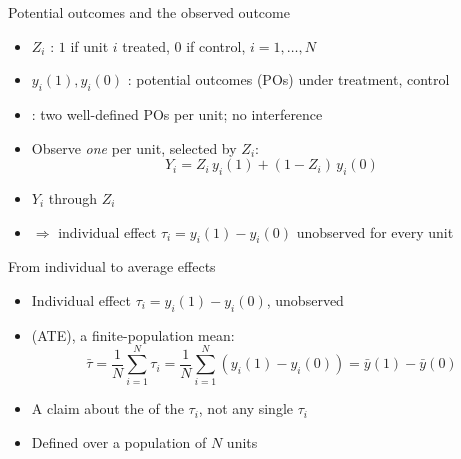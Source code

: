 \documentclass[table, xcolor = {dvipsnames}, 9pt]{beamer}
\theoremstyle{plain}
\newcommand{\mh}[1]{{\color{magenta}{#1}}}
\begin{document}
\begin{frame}[t]{Potential outcomes and the observed outcome}
\vfill
\begin{itemize} \vfill
\item $Z_i$ \mh{random}: $1$ if unit $i$ treated, $0$ if control, $i = 1, \ldots, N$ \vfill
\item $y_i(1), y_i(0)$ \mh{fixed}: potential outcomes (POs) under treatment, control \vfill
\item \mh{SUTVA}: two well-defined POs per unit; no interference \vfill
\item Observe \emph{one} per unit, selected by $Z_i$:
\begin{equation*}
Y_i = Z_i\, y_i(1) + (1 - Z_i)\, y_i(0)
\end{equation*} \vfill
\item $Y_i$ \mh{random} through $Z_i$ \vfill
\item[] $\Rightarrow$ individual effect $\tau_i = y_i(1) - y_i(0)$ unobserved for every unit \vfill
\end{itemize} \vfill
\end{frame}
\begin{frame}[t]{From individual to average effects}
\vfill
\begin{itemize} \vfill
\item Individual effect $\tau_i = y_i(1) - y_i(0)$, unobserved \vfill
\item \mh{Average treatment effect} (ATE), a finite-population mean:
\begin{equation*}
\bar{\tau} = \frac{1}{N}\sum_{i = 1}^N \tau_i = \frac{1}{N}\sum_{i = 1}^N \left(y_i(1) - y_i(0)\right) = \bar{y}(1) - \bar{y}(0)
\end{equation*} \vfill
\item A claim about the \mh{mean} of the $\tau_i$, not any single $\tau_i$ \vfill
\item Defined over a \mh{fixed, finite} population of $N$ units \vfill
\end{itemize} \vfill
\end{frame}
\end{document}

